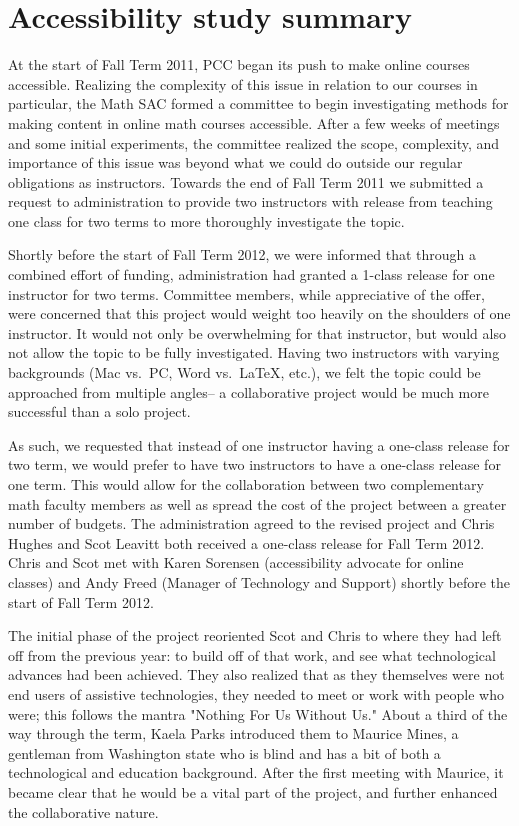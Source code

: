 \chapter{Accessibility study summary}\label{app:sec:accessibility}

At the start of Fall Term 2011, PCC began its push to make online courses accessible. 
Realizing the complexity of this issue in relation to our courses in particular, the Math SAC formed a
committee to begin investigating methods for making content in online math courses accessible. 
After a few weeks of meetings and some initial experiments, the committee realized the scope,
complexity, and importance of this issue was beyond what we could do outside our regular
obligations as instructors.  Towards the end of Fall Term 2011 we submitted a request to
administration to provide two instructors with release from teaching one class for two
terms to more thoroughly investigate the topic.

Shortly before the start of Fall Term 2012, we were informed that through a combined
effort of funding, administration had granted a 1-class release for one instructor for
two terms.  Committee members, while appreciative of the offer, were concerned that this
project would weight too heavily on the shoulders of one instructor.  It would not only be overwhelming for that
instructor, but would also not allow the topic to be fully investigated.  Having two
instructors with varying backgrounds (Mac vs.\ PC, Word vs.\ \LaTeX, etc.), we felt the
topic could be approached from multiple angles-- a collaborative project would
be much more successful than a solo project.

As such, we requested that instead of one instructor having a one-class release for two term, we would prefer to
have two instructors to have a one-class release for one term.  This would allow for the
collaboration between two complementary math faculty members as well as spread the cost of
the project between a greater number of budgets.  The administration agreed to the revised
project and Chris Hughes and Scot Leavitt both received a one-class release for Fall Term 2012. 
Chris and Scot met with Karen Sorensen (accessibility advocate for online classes) and Andy
Freed (Manager of Technology and Support) shortly before the start of Fall Term 2012.

The initial phase of the project reoriented Scot and Chris to where they had left off
from the previous year: to build off of that work, and see what technological advances
had been achieved. They also realized that as they themselves were not
end users of assistive technologies, they needed to meet or work with people who were; this
follows the mantra "Nothing For Us Without Us."  About a third of the way through the
term, Kaela Parks introduced them to Maurice Mines, a gentleman from Washington state who is
blind and has a bit of both a technological and education background.  After the first
meeting with Maurice, it became clear that he would be a vital part of the project, and further enhanced
the collaborative nature.

